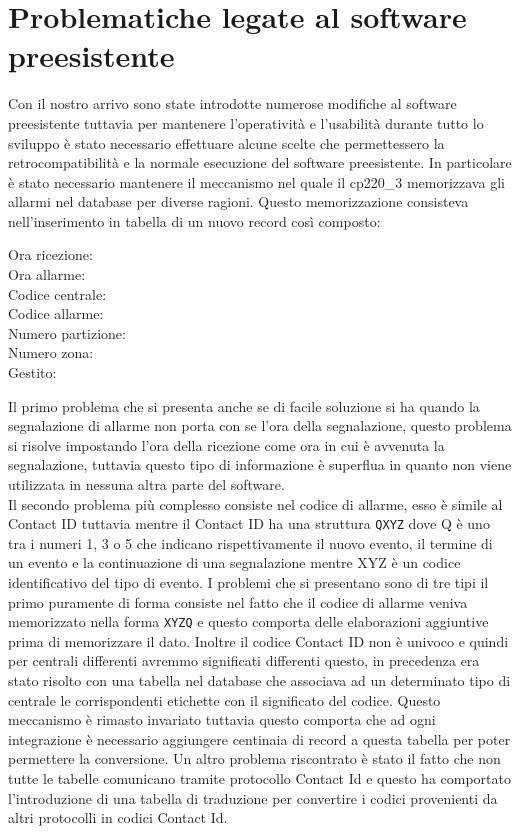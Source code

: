 \section{Problematiche legate al software preesistente}
Con il nostro arrivo sono state introdotte numerose modifiche al software preesistente tuttavia per mantenere l'operatività e l'usabilità durante tutto lo sviluppo è stato necessario effettuare alcune scelte che permettessero la retrocompatibilità e la normale esecuzione del software preesistente. In particolare è stato necessario mantenere il meccanismo nel quale il cp220\_3 memorizzava gli allarmi nel database per diverse ragioni. Questo memorizzazione consisteva nell'inserimento in tabella di un nuovo record così composto:
\begin{description}
	\item[Ora ricezione:]
	\item[Ora allarme:]
	\item[Codice centrale:]
	\item[Codice allarme:]
	\item[Numero partizione:]
	\item[Numero zona:]
	\item[Gestito:]
\end{description}
Il primo problema che si presenta anche se di facile soluzione si ha quando la segnalazione di allarme non porta con se l'ora della segnalazione, questo problema si risolve impostando l'ora della ricezione come ora in cui è avvenuta la segnalazione, tuttavia questo tipo di informazione è superflua in quanto non viene utilizzata in nessuna altra parte del software.\\
Il secondo problema più complesso consiste nel codice di allarme, esso è simile al Contact ID tuttavia mentre il Contact ID ha una struttura \texttt{QXYZ} dove Q è uno tra i numeri 1, 3 o 5 che indicano rispettivamente il nuovo evento, il termine di un evento e la continuazione di una segnalazione mentre XYZ è un codice identificativo del tipo di evento. I problemi che si presentano sono di tre tipi il primo puramente di forma consiste nel fatto che il codice di allarme veniva memorizzato nella forma \texttt{XYZQ} e questo comporta delle elaborazioni aggiuntive prima di memorizzare il dato. Inoltre il codice Contact ID non è univoco e quindi per centrali differenti avremmo significati differenti questo, in precedenza era stato risolto con una tabella nel database che associava ad un determinato tipo di centrale le corrispondenti etichette con il significato del codice. Questo meccanismo è rimasto invariato tuttavia questo comporta che ad ogni integrazione è necessario aggiungere centinaia di record a questa tabella per poter permettere la conversione. Un altro problema riscontrato è stato il fatto che non tutte le tabelle comunicano tramite protocollo Contact Id e questo ha comportato l'introduzione di una tabella di traduzione per convertire i codici provenienti da altri protocolli in codici Contact Id.\\
